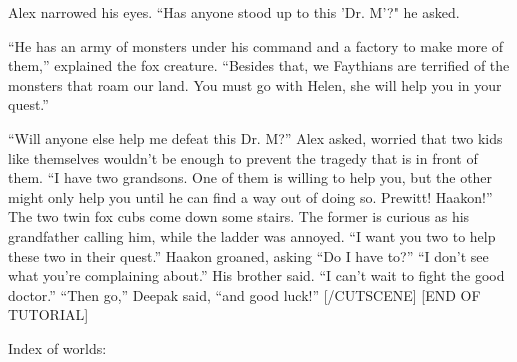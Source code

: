 \documentclass{gd-document}
\begin{document}
Alex narrowed his eyes. “Has anyone stood up to this 'Dr. M'?" he
asked.

“He has an army of monsters under his command and a factory to make
more of them,” explained the fox creature. “Besides that, we Faythians
are terrified of the monsters that roam our land. You must go with
Helen, she will help you in your quest.”

“Will anyone else help me defeat this Dr. M?” Alex asked, worried that
two kids like themselves wouldn't be enough to prevent the tragedy
that is in front of them. “I have two grandsons. One of them is
willing to help you, but the other might only help you until he can
find a way out of doing so. Prewitt! Haakon!” The two twin fox cubs
come down some stairs. The former is curious as his grandfather
calling him, while the ladder was annoyed. “I want you two to help
these two in their quest.” Haakon groaned, asking “Do I have to?” “I
don't see what you're complaining about.” His brother said. “I can't
wait to fight the good doctor.” “Then go,” Deepak said, “and good
luck!” [/CUTSCENE] [END OF TUTORIAL]

Index of worlds:
\end{document}
